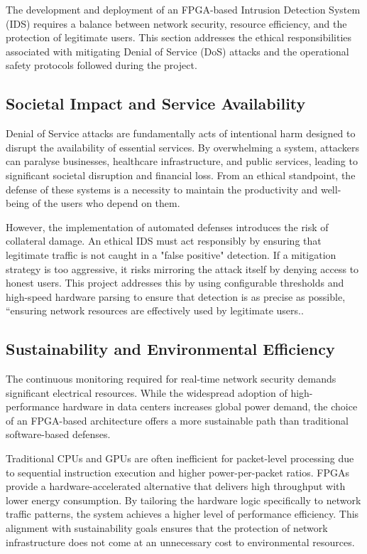The development and deployment of an FPGA-based Intrusion Detection System (IDS) requires a balance between network security, resource efficiency, and the protection of legitimate users. This section addresses the ethical responsibilities associated with mitigating Denial of Service (DoS) attacks and the operational safety protocols followed during the project.

\subsection{Societal Impact and Service Availability}
Denial of Service attacks are fundamentally acts of intentional harm designed to disrupt the availability of essential services. By overwhelming a system, attackers can paralyse businesses, healthcare infrastructure, and public services, leading to significant societal disruption and financial loss. From an ethical standpoint, the defense of these systems is a necessity to maintain the productivity and well-being of the users who depend on them. 

However, the implementation of automated defenses introduces the risk of collateral damage. An ethical IDS must act responsibly by ensuring that legitimate traffic is not caught in a "false positive" detection. If a mitigation strategy is too aggressive, it risks mirroring the attack itself by denying access to honest users. This project addresses this by using configurable thresholds and high-speed hardware parsing to ensure that detection is as precise as possible, “ensuring network resources are effectively used by legitimate users..

\subsection{Sustainability and Environmental Efficiency}
The continuous monitoring required for real-time network security demands significant electrical resources. While the widespread adoption of high-performance hardware in data centers increases global power demand, the choice of an FPGA-based architecture offers a more sustainable path than traditional software-based defenses. 

Traditional CPUs and GPUs are often inefficient for packet-level processing due to sequential instruction execution and higher power-per-packet ratios. FPGAs provide a hardware-accelerated alternative that delivers high throughput with lower energy consumption. By tailoring the hardware logic specifically to network traffic patterns, the system achieves a higher level of performance efficiency. This alignment with sustainability goals ensures that the protection of network infrastructure does not come at an unnecessary cost to environmental resources.

